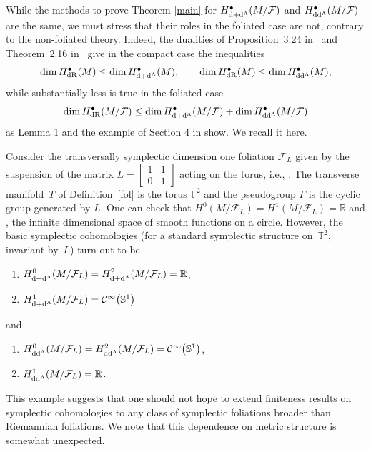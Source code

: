 \documentclass[pdftex]{sigma}
\numberwithin{equation}{section}
\newcommand{\bigslant}[2]{{\raisebox{.2em}{$#1$}\big/\raisebox{-.2em}{$#2$}}}
\begin{document}
While the methods to prove Theorem \ref{main} for $H^{\bullet}_{{\rm d}+{\rm d}^{\Lambda}}(M\slash\mathcal{F})$ and $H^{\bullet}_{{\rm d}{\rm d}^{\Lambda}}(M\slash\mathcal{F})$ are the same, we must stress that their roles in the foliated case are not, contrary to the non-foliated theory. Indeed, the dualities of Proposition~3.24 in~\cite{tseng} and Theorem~2.16 in~\cite{angela} give in the compact case the inequalities
\begin{gather*}
\dim H^{\bullet}_{{\rm dR}}(M)\leq \dim H^{\bullet}_{{\rm d}+{\rm d}^{\Lambda}}(M),\qquad \dim H^{\bullet}_{{\rm dR}}(M)\leq \dim H^{\bullet}_{{\rm d}{\rm d}^{\Lambda}}(M),
\end{gather*}
while substantially less is true in the foliated case
\begin{gather*}
\dim H^{\bullet}_{{\rm dR}}(M\slash\mathcal{F})\leq \dim H^{\bullet}_{{\rm d}+{\rm d}^{\Lambda}}(M\slash\mathcal{F})+\dim H^{\bullet}_{{\rm d}{\rm d}^{\Lambda}}(M\slash\mathcal{F})
\end{gather*}
as Lemma 1 and the example of Section 4 in \cite{pawelija} show. We recall it here.
\begin{Example}\label{przy}
Consider the transversally symplectic dimension one foliation $\mathcal{F}_L$ given by the suspension of the matrix $L=\left[\begin{smallmatrix}1 & 1\\ 0 & 1\end{smallmatrix}\right]$ acting on the torus, i.e., \smash{$\bigslant{\mathbb{T}^2\times [0,1]}{(t,0)\sim (Lt,1)}=M$}. The transverse manifold~$T$ of Definition~\ref{fol} is the torus $\mathbb{T}^2$ and the pseudogroup $\Gamma$ is the cyclic group generated by $L$. One can check that $H^0(M\slash\mathcal{F}_L)=H^1(M\slash\mathcal{F}_L)=\mathbb{R}$ and , the infinite dimensional space of smooth functions on a circle. However, the basic symplectic cohomologies (for a standard symplectic structure on~$\mathbb{T}^2$, invariant by~$L$) turn out to be
\begin{enumerate}\itemsep=0pt
\item[1)] $H^{0}_{{\rm d}+{\rm d}^{\Lambda}}(M\slash\mathcal{F}_L)=H^{2}_{{\rm d}+{\rm d}^{\Lambda}}(M\slash\mathcal{F}_L)=\mathbb{R}$,
\item[2)] $H^{1}_{{\rm d}+{\rm d}^{\Lambda}}(M\slash\mathcal{F}_L)=\mathcal{C}^{\infty}\big(\mathbb{S}^1\big)$
\end{enumerate}
and
\begin{enumerate}\itemsep=0pt
\item[1)] $H^{0}_{{\rm d}{\rm d}^{\Lambda}}(M\slash\mathcal{F}_L)=H^{2}_{{\rm d}{\rm d}^{\Lambda}}(M\slash\mathcal{F}_L)=\mathcal{C}^{\infty}\big(\mathbb{S}^1\big)$,
\item[2)] $H^{1}_{{\rm d}{\rm d}^{\Lambda}}(M\slash\mathcal{F}_L)=\mathbb{R}$.
\end{enumerate}
This example suggests that one should not hope to extend finiteness results on symplectic cohomologies to any class of symplectic foliations broader than Riemannian foliations. We note that this dependence on metric structure is somewhat unexpected.
\end{Example}
\end{document}
